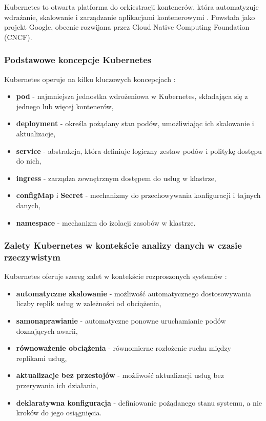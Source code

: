 Kubernetes to otwarta platforma do orkiestracji kontenerów, która automatyzuje wdrażanie, skalowanie i zarządzanie aplikacjami
kontenerowymi \citep{kubernetes}. Powstała jako projekt Google, obecnie rozwijana przez Cloud Native Computing Foundation (CNCF).

\subsubsection{Podstawowe koncepcje Kubernetes}
\label{subsubsec:podstawy_kubernetes}

Kubernetes operuje na kilku kluczowych koncepcjach \citep{kubernetes_concepts}:

\begin{itemize}
    \item \textbf{pod} - najmniejsza jednostka wdrożeniowa w Kubernetes, składająca się z jednego lub więcej kontenerów,
    \item \textbf{deployment} - określa pożądany stan podów, umożliwiając ich skalowanie i aktualizacje,
    \item \textbf{service} - abstrakcja, która definiuje logiczny zestaw podów i politykę dostępu do nich,
    \item \textbf{ingress} - zarządza zewnętrznym dostępem do usług w klastrze,
    \item \textbf{configMap} i \textbf{Secret} - mechanizmy do przechowywania konfiguracji i tajnych danych,
    \item \textbf{namespace} - mechanizm do izolacji zasobów w klastrze.
\end{itemize}

\subsubsection{Zalety Kubernetes w kontekście analizy danych w czasie rzeczywistym}
\label{subsubsec:zalety_kubernetes}

Kubernetes oferuje szereg zalet w kontekście rozproszonych systemów \citep{kubernetes_benefits}:

\begin{itemize}
    \item \textbf{automatyczne skalowanie} - możliwość automatycznego dostosowywania liczby replik usług w zależności od obciążenia,
    \item \textbf{samonaprawianie} - automatyczne ponowne uruchamianie podów doznających awarii,
    \item \textbf{równoważenie obciążenia} - równomierne rozłożenie ruchu między replikami usług,
    \item \textbf{aktualizacje bez przestojów} - możliwość aktualizacji usług bez przerywania ich działania,
    \item \textbf{deklaratywna konfiguracja} - definiowanie pożądanego stanu systemu, a nie kroków do jego osiągnięcia.
\end{itemize}

